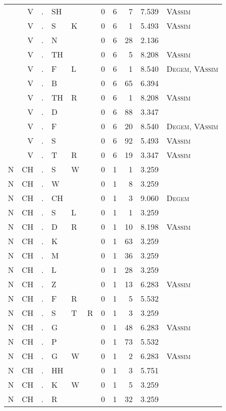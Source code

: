 \begin{longtable}{r@{ } r@{ } c@{ } l@{ } l@{ } l@{ } r r r r l }
 & V & . & SH &  &  & 0 & 6 & 7 & 7.539 & \textsc{VAssim} \\
 & V & . & S & K &  & 0 & 6 & 1 & 5.493 & \textsc{VAssim} \\
 & V & . & N &  &  & 0 & 6 & 28 & 2.136 &  \\
 & V & . & TH &  &  & 0 & 6 & 5 & 8.208 & \textsc{VAssim} \\
 & V & . & F & L &  & 0 & 6 & 1 & 8.540 & \textsc{Degem}, \textsc{VAssim} \\
 & V & . & B &  &  & 0 & 6 & 65 & 6.394 &  \\
 & V & . & TH & R &  & 0 & 6 & 1 & 8.208 & \textsc{VAssim} \\
 & V & . & D &  &  & 0 & 6 & 88 & 3.347 &  \\
 & V & . & F &  &  & 0 & 6 & 20 & 8.540 & \textsc{Degem}, \textsc{VAssim} \\
 & V & . & S &  &  & 0 & 6 & 92 & 5.493 & \textsc{VAssim} \\
 & V & . & T & R &  & 0 & 6 & 19 & 3.347 & \textsc{VAssim} \\
N & CH & . & S & W &  & 0 & 1 & 1 & 3.259 &  \\
N & CH & . & W &  &  & 0 & 1 & 8 & 3.259 &  \\
N & CH & . & CH &  &  & 0 & 1 & 3 & 9.060 & \textsc{Degem} \\
N & CH & . & S & L &  & 0 & 1 & 1 & 3.259 &  \\
N & CH & . & D & R &  & 0 & 1 & 10 & 8.198 & \textsc{VAssim} \\
N & CH & . & K &  &  & 0 & 1 & 63 & 3.259 &  \\
N & CH & . & M &  &  & 0 & 1 & 36 & 3.259 &  \\
N & CH & . & L &  &  & 0 & 1 & 28 & 3.259 &  \\
N & CH & . & Z &  &  & 0 & 1 & 13 & 6.283 & \textsc{VAssim} \\
N & CH & . & F & R &  & 0 & 1 & 5 & 5.532 &  \\
N & CH & . & S & T & R & 0 & 1 & 3 & 3.259 &  \\
N & CH & . & G &  &  & 0 & 1 & 48 & 6.283 & \textsc{VAssim} \\
N & CH & . & P &  &  & 0 & 1 & 73 & 5.532 &  \\
N & CH & . & G & W &  & 0 & 1 & 2 & 6.283 & \textsc{VAssim} \\
N & CH & . & HH &  &  & 0 & 1 & 3 & 5.751 &  \\
N & CH & . & K & W &  & 0 & 1 & 5 & 3.259 &  \\
N & CH & . & R &  &  & 0 & 1 & 32 & 3.259 &  \\

\end{longtable}

